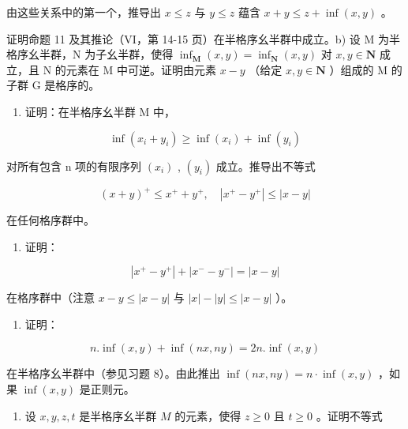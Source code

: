 由这些关系中的第一个，推导出 \(x \leqslant z\) 与 \(y \leqslant z\) 蕴含 \(x + y \leqslant z + \inf(x, y)\) 。

证明命题 11 及其推论（VI，第 14-15 页）在半格序幺半群中成立。b) 设 M 为半格序幺半群，N 为子幺半群，使得 \(\inf_{\mathbf{M}}(x,y) = \inf_{\mathbf{N}}(x,y)\) 对 \(x,y\in \mathbf{N}\) 成立，且 N 的元素在 M 中可逆。证明由元素 \(x - y\) （给定 \(x,y\in \mathbf{N}\) ）组成的 M 的子群 G 是格序的。

\begin{enumerate}
\def\labelenumi{\arabic{enumi})}
\setcounter{enumi}{13}
\tightlist
\item
  证明：在半格序幺半群 M 中，
\end{enumerate}

\[
\inf \left(x _ {i} + y _ {i}\right) \geqslant \inf \left(x _ {i}\right) + \inf \left(y _ {i}\right)
\]

对所有包含 n 项的有限序列 \((x_{i})\) , \((y_{i})\) 成立。推导出不等式

\[
(x + y) ^ {+} \leqslant x ^ {+} + y ^ {+}, \quad | x ^ {+} - y ^ {+} | \leqslant | x - y |
\]

在任何格序群中。

\begin{enumerate}
\def\labelenumi{\arabic{enumi})}
\setcounter{enumi}{14}
\tightlist
\item
  证明：
\end{enumerate}

\[
\left| x ^ {+} - y ^ {+} \right| + \left| x ^ {-} - y ^ {-} \right| = | x - y |
\]

在格序群中（注意 \(x - y \leqslant |x - y|\) 与 \(|x| - |y| \leqslant |x - y|\) ）。

\begin{enumerate}
\def\labelenumi{\arabic{enumi})}
\setcounter{enumi}{15}
\tightlist
\item
  证明：
\end{enumerate}

\[
n. \inf (x, y) + \inf (n x, n y) = 2 n. \inf (x, y)
\]

在半格序幺半群中（参见习题 8）。由此推出 \(\inf(nx, ny) = n \cdot \inf(x, y)\) ，如果 \(\inf(x, y)\) 是正则元。

\begin{enumerate}
\def\labelenumi{\arabic{enumi})}
\setcounter{enumi}{16}
\tightlist
\item
  设 \(x, y, z, t\) 是半格序幺半群 \(M\) 的元素，使得 \(z \geqslant 0\) 且 \(t \geqslant 0\) 。证明不等式
\end{enumerate}

